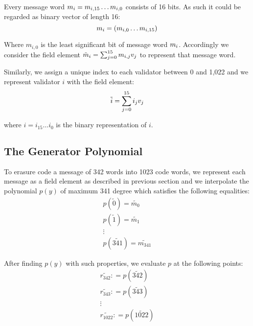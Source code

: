Every message word $m_{i}=m_{i, 15} \ldots m_{i, 0}$ consists of 16 bits. As such it could be regarded as binary vector of length 16:
\begin{equation}
m_{i} = (m_{i, 0} \ldots m_{i, 15})
\end{equation}

Where $m_{i, 0}$ is the least significant bit of message word $m_{i}$. Accordingly we consider the field element $\tilde{m}_{i} = \sum^{15}_{j = 0} m_{i, j} v_{j}$ to represent that message word.

Similarly, we assign a unique index to each validator between 0 and 1,022 and we represent validator $i$ with the field element:
\begin{equation}
\tilde{i} = \sum^{15}_{j = 0} i_{j} v_{j}
\end{equation}

where $i = i_{15} \ldots i_0$ is the binary representation of $i$.

\subsection{The Generator Polynomial}

To erasure code a message of 342 words into 1023 code words, we represent each message as a field element as described in previous section and we interpolate the polynomial $p(y)$ of maximum 341 degree which satisfies the following equalities:
\begin{equation}
   \begin{array}{l}
     p (\tilde{0}) = \widetilde{m_0}\\
     p (\tilde{1}) = \widetilde{m_1}\\
     \vdots\\
     p (\widetilde{341}) = \widetilde{m_{341}}
   \end{array}
\end{equation}

After finding $p(y)$ with such properties, we evaluate $p$ at the following points:
\begin{equation}
   \begin{array}{l}
     \widetilde{r_{342}} : = p (\widetilde{342})\\
     \widetilde{r_{343}} : = p (\widetilde{343})\\
     \vdots\\
     \widetilde{r_{1022}} : = p (\widetilde{1022})
   \end{array}
\end{equation}

